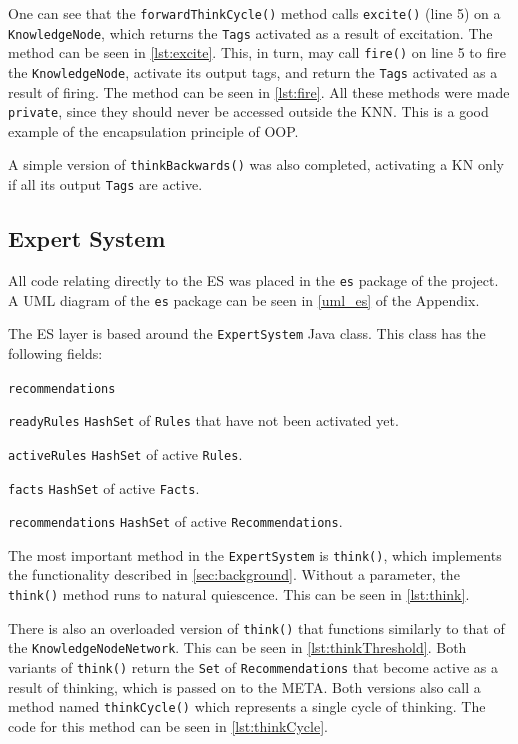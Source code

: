 \documentclass[titlepage,11pt]{article}
\newcommand{\ar}[1]{\autoref{#1}}
\newcommand{\code}[1]{\texttt{#1}}
\begin{document}
One can see that the \code{forwardThinkCycle()} method calls \code{excite()} (line 5) on a \code{KnowledgeNode}, which returns the \code{Tags} activated as a result of excitation. The method can be seen in \autoref{lst:excite}. This, in turn, may call \code{fire()} on line 5 to fire the \code{KnowledgeNode}, activate its output tags, and return the \code{Tags} activated as a result of firing. The method can be seen in \autoref{lst:fire}. All these methods were made \code{private}, since they should never be accessed outside the KNN. This is a good example of the encapsulation principle of OOP.


A simple version of \code{thinkBackwards()} was also completed, activating a KN only if all its output \code{Tags} are active.

\subsection{Expert System}

All code relating directly to the ES was placed in the \code{es} package of the project. A UML diagram of the \code{es} package can be seen in \autoref{uml_es} of the Appendix.

The ES layer is based around the \code{ExpertSystem} Java class. This class has the following fields:

\begin{labeling}{\code{recommendations}}
	\item[\code{readyRules}] \code{HashSet} of \code{Rules} that have not been activated yet.
	\item[\code{activeRules}] \code{HashSet} of active \code{Rules}.
	\item[\code{facts}] \code{HashSet} of active \code{Facts}.
	\item[\code{recommendations}] \code{HashSet} of active \code{Recommendations}.
\end{labeling}

The most important method in the \code{ExpertSystem} is \code{think()}, which implements the functionality described in \ar{sec:background}. Without a parameter, the \code{think()} method runs to natural quiescence. This can be seen in \autoref{lst:think}.

There is also an overloaded version of \code{think()} that functions similarly to that of the \code{KnowledgeNodeNetwork}. This can be seen in \autoref{lst:thinkThreshold}. Both variants of \code{think()} return the \code{Set} of \code{Recommendations} that become active as a result of thinking, which is passed on to the META. Both versions also call a method named \code{thinkCycle()} which represents a single cycle of thinking. The code for this method can be seen in \autoref{lst:thinkCycle}.
\end{document}
